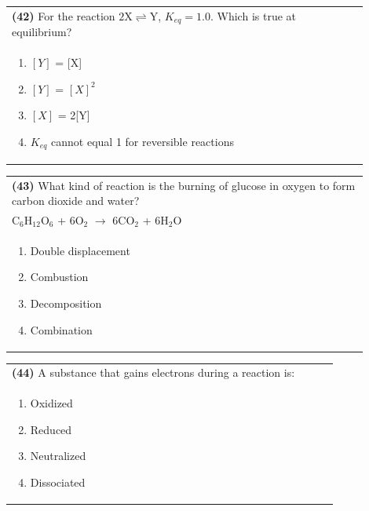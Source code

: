 \documentclass{article}
\begin{document}
\noindent\begin{tabular}{|p{0.9\linewidth}|}
\hline
\textbf{(42)} For the reaction $2\text{X} \rightleftharpoons \text{Y}$, $K_{eq} = 1.0$. Which is true at equilibrium?\\[0.2cm]
\begin{minipage}[t]{0.85\linewidth}
\begin{enumerate}[label=\alph*.]
\item $[Y]$ = [X]
\item $[Y]$ = $[X]^2$
\item $[X]$ = 2[Y]
\item $K_{eq}$ cannot equal 1 for reversible reactions
\end{enumerate}
\end{minipage}\\[0.2cm]
\hline
\end{tabular}

\noindent\begin{tabular}{|p{0.9\linewidth}|}
\hline
\textbf{(43)} What kind of reaction is the burning of glucose in oxygen to form carbon dioxide and water?\\[0.2cm]
C$_6$H$_{12}$O$_6$ + 6O$_2$ $\rightarrow$  6CO$_2$ + 6H$_2$O\\[0.2cm]
\begin{minipage}[t]{0.85\linewidth}
\begin{enumerate}[label=\alph*.]
\item Double displacement
\item Combustion
\item Decomposition
\item Combination
\end{enumerate}
\end{minipage}\\[0.2cm]
\hline
\end{tabular}

\noindent\begin{tabular}{|p{0.9\linewidth}|}
\hline
\textbf{(44)} A substance that gains electrons during a reaction is:\\[0.2cm]
\begin{minipage}[t]{0.85\linewidth}
\begin{enumerate}[label=\alph*.]
\item Oxidized
\item Reduced
\item Neutralized
\item Dissociated
\end{enumerate}
\end{minipage}\\[0.2cm]
\hline
\end{tabular}
\newpage
\end{document}
